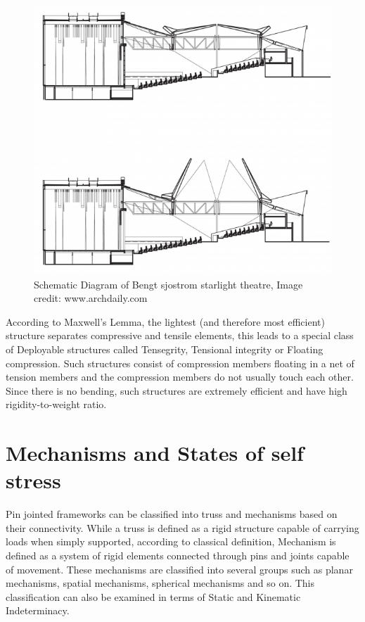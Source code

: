 \begin{figure}[htbp]
    \centering
    \includegraphics[width = 0.8\linewidth]{Figures/Bengt_theatre.jpg}
    \caption{Schematic Diagram of Bengt sjostrom starlight theatre, Image credit: www.archdaily.com}
    \label{fig:Bengt_theatre}
\end{figure} 

According to Maxwell's Lemma, the lightest (and therefore most efficient) structure separates compressive and tensile elements, this leads to a special class of Deployable structures called Tensegrity, Tensional integrity or Floating compression. Such structures consist of compression members floating in a net of tension members and the compression members do not usually touch each other. Since there is no bending, such structures are extremely efficient and have high rigidity-to-weight ratio. \cite{pellegr}

\section{Mechanisms and States of self stress}
Pin jointed frameworks can be classified into truss and mechanisms based on their connectivity. While a truss is defined as a rigid structure capable of carrying loads when simply supported, according to classical definition, Mechanism is defined as a system of rigid elements connected through pins and joints capable of movement. These mechanisms are classified into several groups such as planar mechanisms, spatial mechanisms, spherical mechanisms and so on. This classification can also be examined in terms of Static and Kinematic Indeterminacy.\cite{Pelle}



